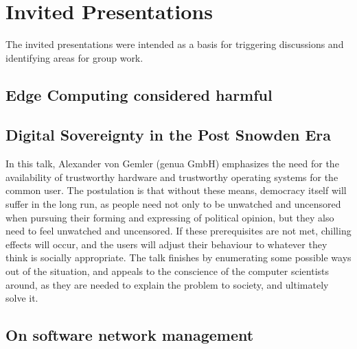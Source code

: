 \section{Invited Presentations}\label{sec:invited-presentations}

The invited presentations were intended as a basis for triggering discussions
and identifying areas for group work.

\subsection{Edge Computing considered harmful}


\subsection{Digital Sovereignty in the Post Snowden Era}

In this talk, Alexander von Gemler (genua GmbH) emphasizes the need for the
availability of trustworthy hardware and trustworthy operating systems for the
common user.  The postulation is that without these means, democracy itself
will suffer in the long run, as people need not only to be unwatched and
uncensored when pursuing their forming and expressing of political opinion,
but they also need to feel unwatched and uncensored.  If these prerequisites
are not met, chilling effects will occur, and the users will adjust their
behaviour to whatever they think is socially appropriate.  The talk finishes
by enumerating some possible ways out of the situation, and appeals to the
conscience of the computer scientists around, as they are needed to explain
the problem to society, and ultimately solve it.


\subsection{On software network management}

